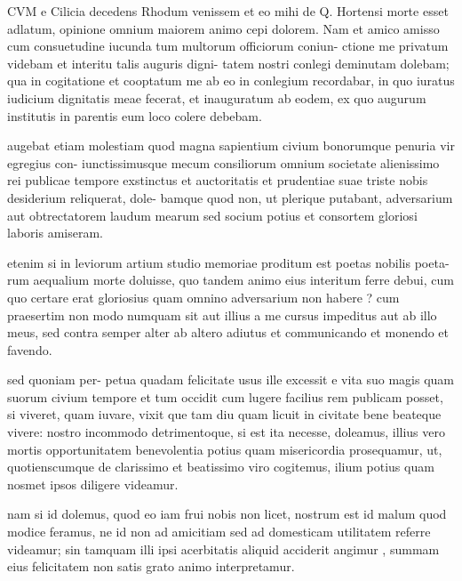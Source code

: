 
 CVM e Cilicia decedens Rhodum venissem et eo mihi de Q. Hortensi morte esset adlatum, opinione omnium maiorem animo cepi dolorem. Nam et amico amisso cum consuetudine iucunda tum multorum officiorum coniun- ctione me privatum videbam et interitu talis auguris digni- tatem nostri conlegi deminutam dolebam; qua in cogitatione et cooptatum me ab eo in conlegium recordabar, in quo iuratus iudicium dignitatis meae fecerat, et inauguratum ab eodem, ex quo augurum institutis in parentis eum loco colere debebam.

 augebat etiam molestiam quod magna sapientium civium bonorumque penuria vir egregius con- iunctissimusque mecum consiliorum omnium societate alienissimo rei publicae tempore exstinctus et auctoritatis et prudentiae suae triste nobis desiderium reliquerat, dole- bamque quod non, ut plerique putabant, adversarium aut obtrectatorem laudum mearum sed socium potius et consortem gloriosi laboris amiseram.

 etenim si in leviorum artium studio memoriae proditum est poetas nobilis poeta- rum aequalium morte doluisse, quo tandem animo eius interitum ferre debui, cum quo certare erat gloriosius quam omnino adversarium non habere ? cum praesertim non modo numquam sit aut illius a me cursus impeditus aut ab illo meus, sed contra semper alter ab altero adiutus et communicando et monendo et favendo.

 sed quoniam per- petua quadam felicitate usus ille excessit e vita suo magis quam suorum civium tempore et tum occidit cum lugere facilius rem publicam posset, si viveret, quam iuvare, vixit que tam diu quam licuit in civitate bene beateque vivere: nostro incommodo detrimentoque, si est ita necesse, doleamus, illius vero mortis opportunitatem benevolentia potius quam misericordia prosequamur, ut, quotienscumque de clarissimo et beatissimo viro cogitemus, ilium potius quam nosmet ipsos diligere videamur.

 nam si id dolemus, quod eo iam frui nobis non licet, nostrum est id malum quod modice feramus, ne id non ad amicitiam sed ad domesticam utilitatem referre videamur; sin tamquam illi ipsi acerbitatis aliquid acciderit angimur , summam eius felicitatem non satis grato animo interpretamur.

